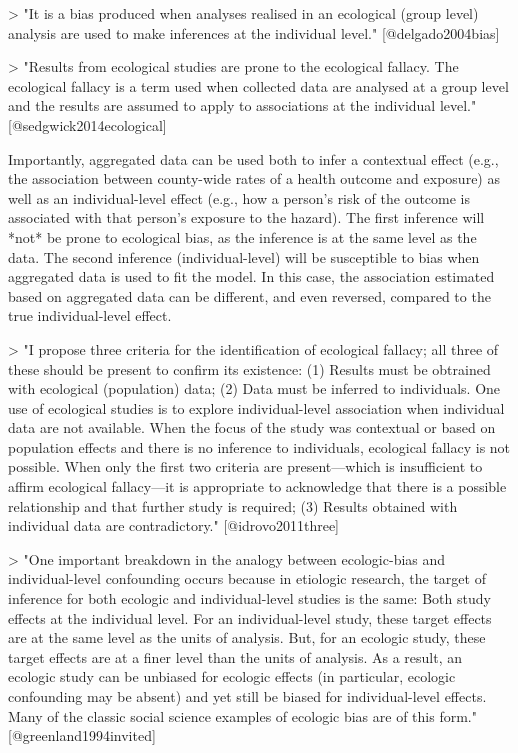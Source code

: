 > "It is a bias produced when analyses realised in an ecological (group level)
analysis are used to make inferences at the individual level."
[@delgado2004bias]

> "Results from ecological studies are prone to the ecological fallacy. The 
ecological fallacy is a term used when collected data are analysed at a 
group level and the results are assumed to apply to associations at the 
individual level." [@sedgwick2014ecological]

Importantly, aggregated data can be used both to infer a contextual effect
(e.g., the association between county-wide rates of a health outcome and 
exposure) as well as an individual-level effect (e.g., how a person's
risk of the outcome is associated with that person's exposure to the hazard). 
The first inference will *not* be prone to ecological bias, as the inference
is at the same level as the data. The second inference (individual-level) 
will be susceptible to bias when aggregated data is used to fit the model. 
In this case, the association estimated based on aggregated data can be 
different, and even reversed, compared to the true individual-level effect. 

> "I propose three criteria for the identification of ecological fallacy; all
three of these should be present to confirm its existence: (1) Results must be
obtrained with ecological (population) data; (2) Data must be inferred to
individuals. One use of ecological studies is to explore individual-level
association when individual data are not available. When the focus of the study
was contextual or based on population effects and there is no inference to
individuals, ecological fallacy is not possible. When only the first two
criteria are present---which is insufficient to affirm ecological fallacy---it
is appropriate to acknowledge that there is a possible relationship and that
further study is required; (3) Results obtained with individual data are
contradictory." [@idrovo2011three]

> "One important breakdown in the analogy between ecologic-bias and
individual-level confounding occurs because in etiologic research, the target of
inference for both ecologic and individual-level studies is the same: Both study
effects at the individual level. For an individual-level study, these target
effects are at the same level as the units of analysis. But, for an ecologic
study, these target effects are at a finer level than the units of analysis. As
a result, an ecologic study can be unbiased for ecologic effects (in particular,
ecologic confounding may be absent) and yet still be biased for individual-level
effects. Many of the classic social science examples of ecologic bias are of
this form." [@greenland1994invited]

